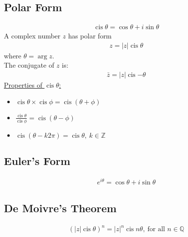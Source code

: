 \documentclass[10pt, a4paper, titlepage]{article}
\DeclareMathOperator\cis{cis}
\begin{document}
\begin{multicols*}{3}
\subsection{Polar Form}
\begin{align}
	\cis{\theta}=\cos{\theta}+i\sin{\theta}
\end{align}
A complex number $z$ has polar form
\begin{align}
	z=|z|\cis{\theta}
\end{align}
where $\theta = \arg{z}$.\\
The conjugate of $z$ is:
\begin{align}
	\bar{z}=|z|\cis{-\theta}
\end{align}
\underline{Properties of $\cis{\theta}$:}
\begin{itemize}
	\item $\cis{\theta}\times \cis{\phi}=\cis{(\theta +\phi )}$
	\item $\frac{\cis{\theta}}{\cis{\phi}}=\cis{(\theta -\phi )}$
	\item $\cis{(\theta -k2\pi )}=\cis{\theta},\ k\in \mathbb{Z}$
\end{itemize}
\dotfill
\subsection{Euler's Form}
\begin{align}
	e^{i\theta}=\cos{\theta}+i\sin{\theta}
\end{align}
\dotfill
\subsection{De Moivre's Theorem}
\begin{align}
	(|z|\cis{\theta})^n=|z|^n\cis{n\theta},\ \text{for all }n\in \mathbb{Q}
\end{align}
\hrulefill

\end{multicols*}
\end{document}
